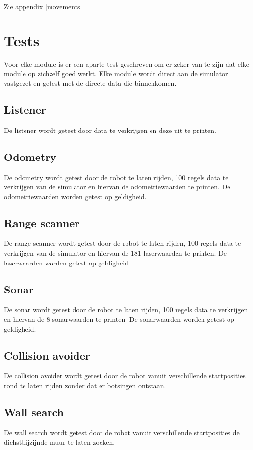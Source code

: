 \documentclass[a4paper,10pt]{article}
\begin{document}
Zie appendix \ref{movements}

\section{Tests}
Voor elke module is er een aparte test geschreven om er zeker van te zijn dat elke module op zichzelf goed werkt. Elke module wordt direct aan de simulator vastgezet en getest met de directe data die binnenkomen. 

\subsection{Listener}
De listener wordt getest door data te verkrijgen en deze uit te printen.

\subsection{Odometry}
De odometry wordt getest door de robot te laten rijden, 100 regels data te verkrijgen van de simulator en hiervan de odometriewaarden te printen. De odometriewaarden worden getest op geldigheid.
\subsection{Range scanner}
De range scanner wordt getest door de robot te laten rijden, 100 regels data te verkrijgen van de simulator en hiervan de 181 laserwaarden te printen. De laserwaarden worden getest op geldigheid.

\subsection{Sonar}
De sonar wordt getest door de robot te laten rijden, 100 regels data te verkrijgen en hiervan de 8 sonarwaarden te printen. De sonarwaarden worden getest op geldigheid.

\subsection{Collision avoider}
De collision avoider wordt getest door de robot vanuit verschillende startposities rond te laten rijden zonder dat er botsingen ontstaan.

\subsection{Wall search}
De wall search wordt getest door de robot vanuit verschillende startposities de dichstbijzijnde muur te laten zoeken. 
\end{document}
